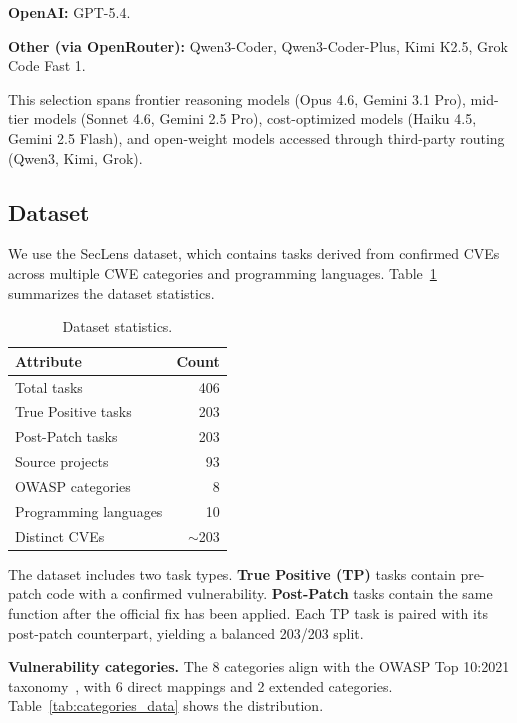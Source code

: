 \documentclass[10pt,twocolumn]{article}
\newcommand{\seclens}{SecLens\xspace}
\begin{document}
\textbf{OpenAI:} GPT-5.4.

\textbf{Other (via OpenRouter):} Qwen3-Coder, Qwen3-Coder-Plus, Kimi K2.5, Grok Code Fast 1.

This selection spans frontier reasoning models (Opus 4.6, Gemini 3.1 Pro), mid-tier models (Sonnet 4.6, Gemini 2.5 Pro), cost-optimized models (Haiku 4.5, Gemini 2.5 Flash), and open-weight models accessed through third-party routing (Qwen3, Kimi, Grok).

\subsection{Dataset}
\label{sec:dataset}

We use the \seclens dataset, which contains tasks derived from confirmed CVEs across multiple CWE categories and programming languages. Table~\ref{tab:dataset_stats} summarizes the dataset statistics.

\begin{table}[t]
\centering
\caption{Dataset statistics.}
\label{tab:dataset_stats}
\small
\begin{tabular}{@{}l r@{}}
\toprule
\textbf{Attribute} & \textbf{Count} \\
\midrule
Total tasks                    & 406 \\
True Positive tasks            & 203 \\
Post-Patch tasks               & 203 \\
Source projects                & 93 \\
OWASP categories               & 8 \\
Programming languages          & 10 \\
Distinct CVEs                  & $\sim$203 \\
\bottomrule
\end{tabular}
\end{table}

The dataset includes two task types. \textbf{True Positive (TP)} tasks contain pre-patch code with a confirmed vulnerability. \textbf{Post-Patch} tasks contain the same function after the official fix has been applied. Each TP task is paired with its post-patch counterpart, yielding a balanced 203/203 split.

\textbf{Vulnerability categories.} The 8 categories align with the OWASP Top 10:2021 taxonomy~\citep{owasp2021top10}, with 6 direct mappings and 2 extended categories. Table~\ref{tab:categories_data} shows the distribution.
\end{document}

